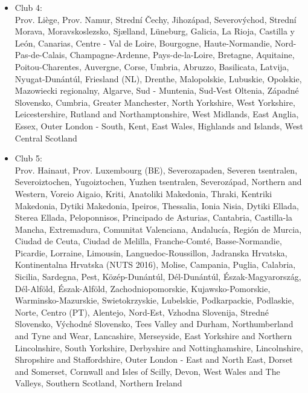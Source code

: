 \documentclass[11pt]{article}
\begin{document}
\begin{itemize}
\item Club 4:\\
Prov. Liège, Prov. Namur, Strední Čechy, Jihozápad, Severovýchod, Strední Morava, Moravskoslezsko, Sjælland, Lüneburg, Galicia, La Rioja, Castilla y León, Canarias, Centre - Val de Loire, Bourgogne, Haute-Normandie, Nord-Pas-de-Calais, Champagne-Ardenne, Pays-de-la-Loire, Bretagne, Aquitaine, Poitou-Charentes, Auvergne, Corse, Umbria, Abruzzo, Basilicata, Latvija, Nyugat-Dunántúl, Friesland (NL), Drenthe, Malopolskie, Lubuskie, Opolskie, Mazowiecki regionalny, Algarve, Sud - Muntenia, Sud-Vest Oltenia, Západné Slovensko, Cumbria, Greater Manchester, North Yorkshire, West Yorkshire, Leicestershire, Rutland and Northamptonshire, West Midlands, East Anglia, Essex, Outer London - South, Kent, East Wales, Highlands and Islands, West Central Scotland

\item Club 5:\\
	
Prov. Hainaut, Prov. Luxembourg (BE), Severozapaden, Severen tsentralen, Severoiztochen, Yugoiztochen, Yuzhen tsentralen, Severozápad, Northern and Western, Voreio Aigaio, Kriti, Anatoliki Makedonia, Thraki, Kentriki Makedonia, Dytiki Makedonia, Ipeiros, Thessalia, Ionia Nisia, Dytiki Ellada, Sterea Ellada, Peloponnisos, Principado de Asturias, Cantabria, Castilla-la Mancha, Extremadura, Comunitat Valenciana, Andalucía, Región de Murcia, Ciudad de Ceuta, Ciudad de Melilla, Franche-Comté, Basse-Normandie, Picardie, Lorraine, Limousin, Languedoc-Roussillon, Jadranska Hrvatska, Kontinentalna Hrvatska (NUTS 2016), Molise, Campania, Puglia, Calabria, Sicilia, Sardegna, Pest, Közép-Dunántúl, Dél-Dunántúl, Észak-Magyarország, Dél-Alföld, Észak-Alföld, Zachodniopomorskie, Kujawsko-Pomorskie, Warminsko-Mazurskie, Swietokrzyskie, Lubelskie, Podkarpackie, Podlaskie, Norte, Centro (PT), Alentejo, Nord-Est, Vzhodna Slovenija, Stredné Slovensko, Východné Slovensko, Tees Valley and Durham, Northumberland and Tyne and Wear, Lancashire, Merseyside, East Yorkshire and Northern Lincolnshire, South Yorkshire, Derbyshire and Nottinghamshire, Lincolnshire, Shropshire and Staffordshire, Outer London - East and North East, Dorset and Somerset, Cornwall and Isles of Scilly, Devon, West Wales and The Valleys, Southern Scotland, Northern Ireland


\end{itemize}
\end{document}
